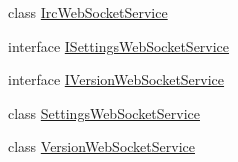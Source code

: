 \begin{DoxyCompactItemize}
\item 
class \mbox{\hyperlink{class_little_weeb_library_1_1_services_1_1_irc_web_socket_service}{Irc\+Web\+Socket\+Service}}
\item 
interface \mbox{\hyperlink{interface_little_weeb_library_1_1_services_1_1_i_settings_web_socket_service}{I\+Settings\+Web\+Socket\+Service}}
\item 
interface \mbox{\hyperlink{interface_little_weeb_library_1_1_services_1_1_i_version_web_socket_service}{I\+Version\+Web\+Socket\+Service}}
\item 
class \mbox{\hyperlink{class_little_weeb_library_1_1_services_1_1_settings_web_socket_service}{Settings\+Web\+Socket\+Service}}
\item 
class \mbox{\hyperlink{class_little_weeb_library_1_1_services_1_1_version_web_socket_service}{Version\+Web\+Socket\+Service}}
\end{DoxyCompactItemize}
